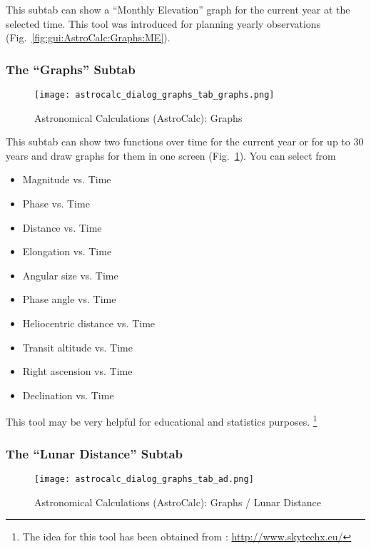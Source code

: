 This subtab  can show a ``Monthly Elevation'' graph for the current year at the selected time.
This tool was introduced for planning yearly observations (Fig.~\ref{fig:gui:AstroCalc:Graphs:ME}).

\subsubsection{The ``Graphs'' Subtab}
\label{sec:gui:AstroCalc:Graphs:Graphs}
    
\begin{figure}[tbp]
\centering\texttt{[image: astrocalc\_dialog\_graphs\_tab\_graphs.png]}
\caption{Astronomical Calculations (AstroCalc): Graphs}
\label{fig:gui:AstroCalc:Graphs:Graphs}
\end{figure}
  
This subtab  can show two functions over time for
the current year or for up to 30 years and draw graphs
for them in one screen (Fig.~\ref{fig:gui:AstroCalc:Graphs:Graphs}).
You can select from
\begin{itemize}
\item Magnitude vs. Time
\item Phase vs. Time
\item Distance vs. Time 
\item Elongation vs. Time 
\item Angular size vs. Time
\item Phase angle vs. Time
\item Heliocentric distance vs. Time
\item Transit altitude vs. Time
\item Right ascension vs. Time
\item Declination vs. Time
\end{itemize}

This tool may be very helpful for educational and statistics purposes.%
	\footnote{The idea for this tool has been obtained from : \url{http://www.skytechx.eu/}}
	
\subsubsection{The ``Lunar Distance'' Subtab}
\label{sec:gui:AstroCalc:Graphs:LD}

\begin{figure}[tbp]
\centering\texttt{[image: astrocalc\_dialog\_graphs\_tab\_ad.png]}
\caption{Astronomical Calculations (AstroCalc): Graphs / Lunar Distance}
\label{fig:gui:AstroCalc:Graphs:LD}
\end{figure}

